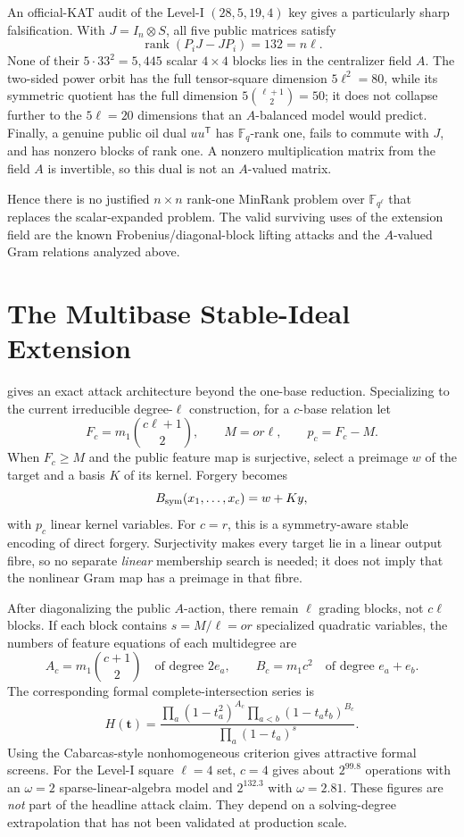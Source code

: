\documentclass[11pt]{article}
\newcommand{\F}{\mathbb F}
\newcommand{\rank}{\operatorname{rank}}
\newcommand{\transpose}{\mathsf T}
\begin{document}
An official-KAT audit of the Level-I $(28,5,19,4)$ key gives a particularly
sharp falsification.  With $J=I_n\otimes S$, all five public matrices satisfy
\[
 \rank(P_iJ-JP_i)=132=n\ell.
\]
None of their $5\cdot33^2=5{,}445$ scalar $4\times4$ blocks lies in the
centralizer field $A$.  The two-sided power orbit has the full tensor-square
dimension $5\ell^2=80$, while its symmetric quotient has the full dimension
$5\binom{\ell+1}{2}=50$; it does not collapse further to the
$5\ell=20$ dimensions that an $A$-balanced model would predict.  Finally, a
genuine public oil dual $uu^\transpose$ has $\F_q$-rank one, fails to commute
with $J$, and has nonzero blocks of rank one.  A nonzero multiplication matrix
from the field $A$ is invertible, so this dual is not an $A$-valued matrix.

Hence there is no justified $n\times n$ rank-one MinRank problem over
$\F_{q^\ell}$ that replaces the scalar-expanded problem.  The valid surviving
uses of the extension field are the known Frobenius/diagonal-block lifting
attacks and the $A$-valued Gram relations analyzed above.

\section{The Multibase Stable-Ideal Extension}\label{app:multibase}

 gives an exact attack architecture beyond the one-base
reduction.  Specializing to the current irreducible degree-$\ell$ construction,
for a $c$-base relation let
\[
 F_c=m_1\binom{c\ell+1}{2},\qquad M=or\ell,
 \qquad p_c=F_c-M.
\]
When $F_c\ge M$ and the public feature map is surjective, select a preimage
$w$ of the target and a basis $K$ of its kernel.  Forgery becomes
\begin{equation}\label{eq:lifted-multibase}
 B_{\rm sym}(x_1,\ldots,x_c)=w+Ky,
\end{equation}
with $p_c$ linear kernel variables.  For $c=r$, this is a symmetry-aware
stable encoding of direct forgery.  Surjectivity makes every target lie in a
linear output fibre, so no separate \emph{linear} membership search is needed;
it does not imply that the nonlinear Gram map has a preimage in that fibre.

After diagonalizing the public $A$-action, there remain $\ell$ grading blocks,
not $c\ell$ blocks.  If each block contains $s=M/\ell=or$ specialized
quadratic variables, the numbers of feature equations of each multidegree are
\[
 A_c=m_1\binom{c+1}{2}
 \quad\text{of degree }2e_a,
 \qquad
 B_c=m_1c^2
 \quad\text{of degree }e_a+e_b.
\]
The corresponding formal complete-intersection series is
\[
 H(\mathbf t)=
 \frac{\prod_a(1-t_a^2)^{A_c}
       \prod_{a<b}(1-t_at_b)^{B_c}}
      {\prod_a(1-t_a)^s}.
\]
Using the Cabarcas-style nonhomogeneous criterion gives attractive formal
screens.  For the Level-I square $\ell=4$ set, $c=4$ gives about
$2^{99.8}$ operations with an $\omega=2$ sparse-linear-algebra model and
$2^{132.3}$ with $\omega=2.81$.  These figures are \emph{not} part of the
headline attack claim.  They depend on a solving-degree extrapolation that has
not been validated at production scale.
\end{document}
